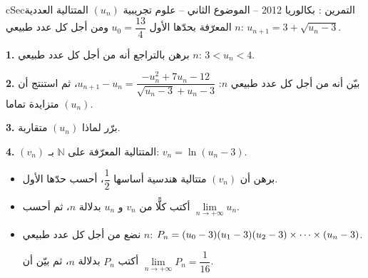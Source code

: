 \documentclass[12pt,a4paper]{article}
\newenvironment{BOX}[2]{\begin{otherlanguage}{english}\begin{arbox}{#1}{#2}}{\end{arbox}\end{otherlanguage}}
\newcounter{exo}
\newenvironment{tamrin}[1]{\stepcounter{exo}\begin{BOX}{cSec}{التمرين \theexo: #1}}{\end{BOX}}
\renewcommand{\cdots}{\mathinner{\cdotp\cdotp\cdotp}}
\newcommand{\N}{\mathbb{N}}
\newenvironment{sq}{\begin{itemize}[leftmargin=2.4em,itemsep=3pt]}{\end{itemize}}
\newcommand{\qa}{\item[(أ)]}\newcommand{\qb}{\item[(ب)]}\newcommand{\qc}{\item[(جـ)]}\newcommand{\qd}{\item[(د)]}\newcommand{\qe}{\item[(هـ)]}
\newcommand{\QQ}[1]{\par\smallskip\textbf{#1.} }
\begin{document}
\begin{tamrin}{بكالوريا 2012 -- الموضوع الثاني -- علوم تجريبية}
$(u_n)$ المتتالية العددية المعرّفة بحدّها الأول $u_0=\dfrac{13}{4}$ ومن أجل كل عدد طبيعي $n$: $u_{n+1}=3+\sqrt{u_n-3}$.
\QQ{1} برهن بالتراجع أنه من أجل كل عدد طبيعي $n$: $3<u_n<4$.
\QQ{2} بيّن أنه من أجل كل عدد طبيعي $n$: $u_{n+1}-u_n=\dfrac{-u_n^2+7u_n-12}{\sqrt{u_n-3}+u_n-3}$، ثم استنتج أن $(u_n)$ متزايدة تماما.
\QQ{3} برّر لماذا $(u_n)$ متقاربة.
\QQ{4} $(v_n)$ المتتالية المعرّفة على $\N$ بـ: $v_n=\ln\left(u_n-3\right)$.
\begin{sq}
\qa برهن أن $(v_n)$ متتالية هندسية أساسها $\dfrac{1}{2}$، أحسب حدّها الأول.
\qb أكتب كلًّا من $v_n$ و $u_n$ بدلالة $n$، ثم أحسب $\lim\limits_{n\to+\infty}u_n$.
\qc نضع من أجل كل عدد طبيعي $n$: $P_n=(u_0-3)(u_1-3)(u_2-3)\times\cdots\times(u_n-3)$.

أكتب $P_n$ بدلالة $n$، ثم بيّن أن $\lim\limits_{n\to+\infty}P_n=\dfrac{1}{16}$.
\end{sq}
\end{tamrin}
\end{document}
